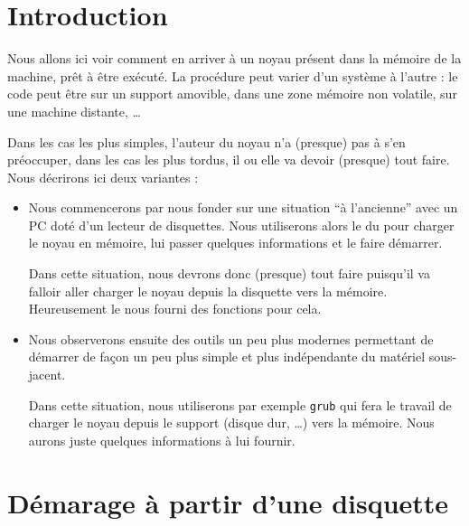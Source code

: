 \section{Introduction}

   Nous allons ici voir comment en arriver à un noyau présent dans la
mémoire de la machine, prêt à être exécuté. La procédure peut varier
d'un système à l'autre : le code peut être sur un support amovible,
dans une zone mémoire non volatile, sur une machine distante, \ldots


   Dans les cas les plus simples, l'auteur du noyau n'a (presque) pas
à s'en préoccuper, dans les cas les plus tordus, il ou elle va devoir
(presque) tout faire. Nous décrirons ici deux variantes :

\begin{itemize}
   \item Nous commencerons par nous fonder sur une situation ``à
     l'ancienne'' avec un PC doté d'un lecteur de
     disquettes. Nous utiliserons alors le \bios du \pc
     pour charger le noyau en mémoire, lui passer quelques
     informations et le faire démarrer.

     Dans cette situation, nous devrons donc (presque) tout faire
     puisqu'il va falloir aller charger le noyau depuis la disquette
     vers la mémoire. Heureusement le \bios nous fourni des fonctions
     pour cela.

   \item Nous observerons ensuite des outils un peu plus modernes
     permettant de démarrer de façon un peu plus simple et plus
     indépendante du matériel sous-jacent.

     Dans cette situation, nous utiliserons par exemple {\tt grub} qui fera
     le travail de charger le noyau depuis le support (disque dur,
     \ldots) vers la mémoire. Nous aurons juste quelques informations
     à lui fournir.
  
\end{itemize}

%
\section{Démarage à partir d'une disquette}

